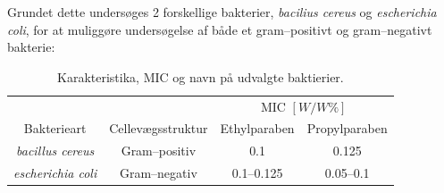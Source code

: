     Grundet dette undersøges 2 forskellige bakterier, \textit{bacilius cereus} og \textit{escherichia coli}, for at muliggøre undersøgelse af både et gram--positivt og gram--negativt bakterie:
    \begin{table}[H]\centering
        \caption{Karakteristika, MIC og navn på udvalgte baktierier.}
        \begin{tabular}{cccc}
            \toprule
            & & \multicolumn{2}{c}{MIC $\left[\si{W\per W\%}\right]$} \\
            \cmidrule(r){3-4}
            Bakterieart & Cellevægsstruktur & Ethylparaben & Propylparaben \\
            \midrule
            \textit{bacillus cereus} & Gram--positiv & 0.1 & 0.125 \\
            \textit{escherichia coli} & Gram--negativ & 0.1--0.125 & 0.05--0.1 \\
            \bottomrule
        \end{tabular}
    \end{table}
    

